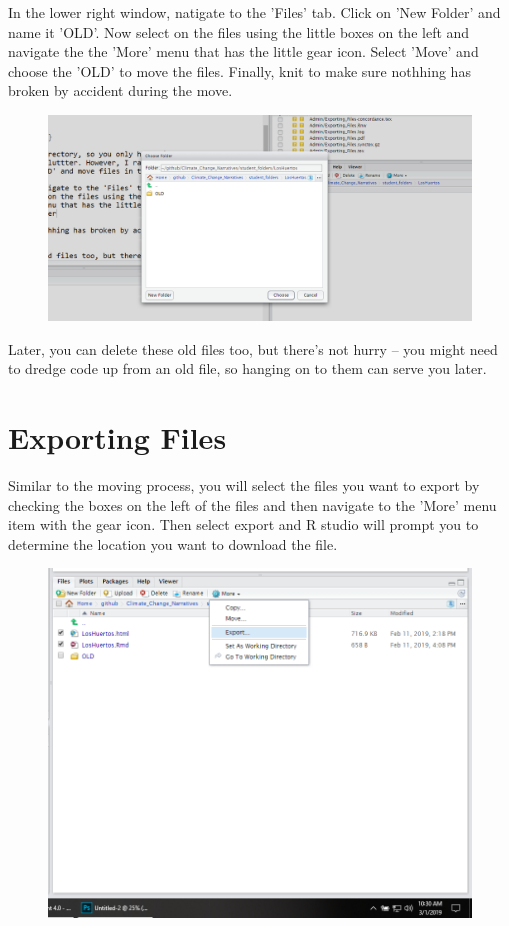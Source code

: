 \documentclass{article}\usepackage[]{graphicx}\usepackage[]{color}
\begin{document}
In the lower right window, natigate to the 'Files' tab. Click on 'New Folder' and name it 'OLD'. Now select on the files using the little boxes on the left and navigate the the 'More' menu that has the little gear icon. Select 'Move' and choose the 'OLD' to move the files. Finally, knit to make sure nothhing has broken by accident during the move. 

\begin{figure}
\includegraphics[width=\textwidth]{MoveFiles}
\end{figure}


Later, you can delete these old files too, but there's not hurry -- you might need to dredge code up from an old file, so hanging on to them can serve you later. 

\section{Exporting Files}

Similar to the moving process, you will select the files you want to export by checking the boxes on the left of the files and then navigate to the 'More' menu item with the gear icon. Then select export and R studio will prompt you to determine the location you want to download the file.

\begin{figure}[h]
\includegraphics[width=\textwidth]{ExportFiles}
\end{figure}
\end{document}
